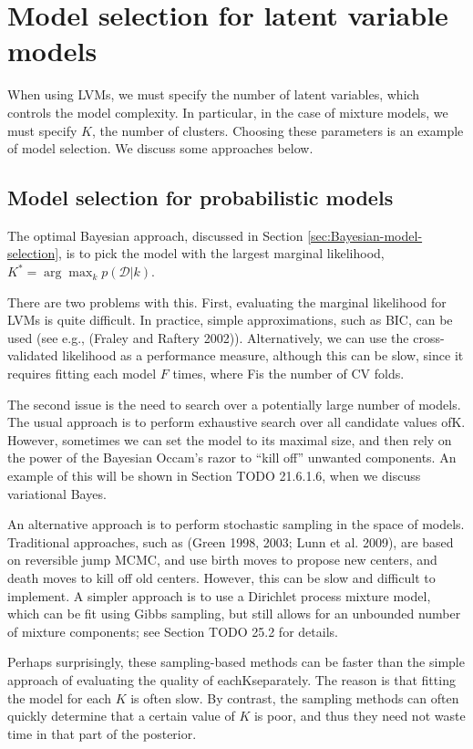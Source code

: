 \section{Model selection for latent variable models}
When using LVMs, we must specify the number of latent variables, which controls the model complexity. In particular, in the case of mixture models, we must specify $K$, the number of clusters. Choosing these parameters is an example of model selection. We discuss some approaches below.


\subsection{Model selection for probabilistic models}
The optimal Bayesian approach, discussed in Section \ref{sec:Bayesian-model-selection}, is to pick the model with the largest marginal likelihood, $K^*=\arg\max_k p(\mathcal{D}|k)$.

There are two problems with this. First, evaluating the marginal likelihood for LVMs is quite difficult. In practice, simple approximations, such as BIC, can be used (see e.g., (Fraley and Raftery 2002)). Alternatively, we can use the cross-validated likelihood as a performance measure, although this can be slow, since it requires fitting each model $F$ times, where Fis the number of CV folds.

The second issue is the need to search over a potentially large number of models. The usual approach is to perform exhaustive search over all candidate values ofK. However, sometimes we can set the model to its maximal size, and then rely on the power of the Bayesian Occam’s razor to “kill off” unwanted components. An example of this will be shown in Section TODO 21.6.1.6, when we discuss variational Bayes.

An alternative approach is to perform stochastic sampling in the space of models. Traditional approaches, such as (Green 1998, 2003; Lunn et al. 2009), are based on reversible jump MCMC, and use birth moves to propose new centers, and death moves to kill off old centers. However, this can be slow and difficult to implement. A simpler approach is to use a Dirichlet process mixture model, which can be fit using Gibbs sampling, but still allows for an unbounded number of mixture components; see Section TODO 25.2 for details.

Perhaps surprisingly, these sampling-based methods can be faster than the simple approach of evaluating the quality of eachKseparately. The reason is that fitting the model for each $K$ is often slow. By contrast, the sampling methods can often quickly determine that a certain value of $K$ is poor, and thus they need not waste time in that part of the posterior.


